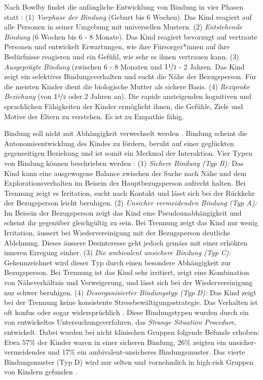 Nach Bowlby findet die anfängliche Entwicklung von Bindung in vier Phasen statt \cite{Siegler2008}: (1) \textit{Vorphase der Bindung} (Geburt bis 6 Wochen). Das Kind reagiert auf alle Personen in seiner Umgebung mit universellen Mustern. (2) \textit{Entstehende Bindung} (6 Wochen bis 6 - 8 Monate). Das Kind reagiert bevorzugt auf vertraute Personen und entwickelt Erwartungen, wie ihre Fürsorger*innen auf ihre Bedürfnisse reagieren und ein Gefühl, wie sehr es ihnen vertrauen kann. (3) \textit{Ausgeprägte Bindung} (zwischen 6 - 8 Monaten und $1\nicefrac{1}{2}$ - 2 Jahren. Das Kind zeigt ein selektives Bindungsverhalten und sucht die Nähe der Bezugsperson. Für die meisten Kinder dient die biologische Mutter als sichere Basis. (4) \textit{Reziproke Beziehung} (von $1\nicefrac{1}{2}$ oder 2 Jahren an). Die rapide ansteigenden kognitiven und sprachlichen Fähigkeiten der Kinder ermöglicht ihnen, die Gefühle, Ziele und Motive der Eltern zu verstehen. Es ist zu Empathie fähig.

Bindung soll nicht mit Abhängigkeit verwechselt werden \cite{Schmidt1996}. Bindung scheint die Autonomieentwicklung des Kindes zu fördern, beruht auf einer geglückten gegenseitigen Beziehung und ist somit ein Merkmal der Interaktion. Vier Typen von Bindung können beschrieben werden \cite{Resch1999}: (1) \textit{Sichere Bindung (Typ B):} Das Kind kann eine ausgewogene Balance zwischen der Suche nach Nähe und dem Explorationsverhalten im Beisein der Hauptbezugsperson aufrecht halten. Bei Trennung zeigt es Irritation, sucht nach Kontakt und lässt sich bei der Rückkehr der Bezugsperson leicht beruhigen. (2) \textit{Unsicher vermeidenden Bindung (Typ A):} Im Beisein der Bezugsperson zeigt das Kind eine Pseudounabhängigkeit und scheint ihr gegenüber gleichgültig zu sein. Bei Trennung zeigt das Kind nur wenig Irritation, äussert bei Wiedervereinigung mit der Bezugsperson deutliche Ablehnung. Dieses äussere Desinteresse geht jedoch gemäss  mit einer erhöhten inneren Erregung einher. (3) \textit{Die ambivalent unsichere Bindung (Typ C):} Gekennzeichnet wird dieser Typ durch einen besondere Abhängigkeit zur Bezugsperson. Bei Trennung ist das Kind sehr irritiert, zeigt eine Kombination von Näheverhältnis und Verweigerung, und lässt sich bei der Wiedervereinigung nur schwer beruhigen. (4) \textit{Desorganisierter Bindungstyp (Typ D):} Das Kind zeigt bei der Trennung keine konsistente Stressbewältigungsstrategie. Das Verhalten ist oft konfus oder sogar widersprüchlich \cite{Siegler2008}. Diese Bindungstypen wurden durch ein von  entwickeltes Untersuchungsverfahren, das \textit{Strange Situation Procedure}, entwickelt. Dabei wurden bei nicht klinischen Gruppen folgende Befunde erhoben: Etwa 57\% der Kinder waren in einer sicheren Bindung, 26\% zeigten ein unsicher-vermeidendes und 17\% ein ambivalent-unsicheres Bindungsmuster. Das vierte Bindungsmuster (Typ D) wird nur selten und vornehmlich in high-risk Gruppen von Kindern gefunden \cite{Resch1999}.

